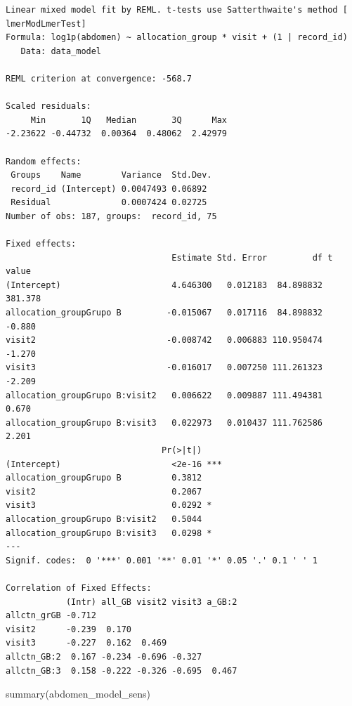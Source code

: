 \documentclass[
  letterpaper,
  DIV=11,
  numbers=noendperiod]{scrartcl}
\newenvironment{Shaded}{\begin{snugshade}}{\end{snugshade}}
\newcommand{\FunctionTok}[1]{\textcolor[rgb]{0.28,0.35,0.67}{#1}}
\newcommand{\NormalTok}[1]{\textcolor[rgb]{0.00,0.23,0.31}{#1}}
\begin{document}
\begin{verbatim}
Linear mixed model fit by REML. t-tests use Satterthwaite's method [
lmerModLmerTest]
Formula: log1p(abdomen) ~ allocation_group * visit + (1 | record_id)
   Data: data_model

REML criterion at convergence: -568.7

Scaled residuals: 
     Min       1Q   Median       3Q      Max 
-2.23622 -0.44732  0.00364  0.48062  2.42979 

Random effects:
 Groups    Name        Variance  Std.Dev.
 record_id (Intercept) 0.0047493 0.06892 
 Residual              0.0007424 0.02725 
Number of obs: 187, groups:  record_id, 75

Fixed effects:
                                 Estimate Std. Error         df t value
(Intercept)                      4.646300   0.012183  84.898832 381.378
allocation_groupGrupo B         -0.015067   0.017116  84.898832  -0.880
visit2                          -0.008742   0.006883 110.950474  -1.270
visit3                          -0.016017   0.007250 111.261323  -2.209
allocation_groupGrupo B:visit2   0.006622   0.009887 111.494381   0.670
allocation_groupGrupo B:visit3   0.022973   0.010437 111.762586   2.201
                               Pr(>|t|)    
(Intercept)                      <2e-16 ***
allocation_groupGrupo B          0.3812    
visit2                           0.2067    
visit3                           0.0292 *  
allocation_groupGrupo B:visit2   0.5044    
allocation_groupGrupo B:visit3   0.0298 *  
---
Signif. codes:  0 '***' 0.001 '**' 0.01 '*' 0.05 '.' 0.1 ' ' 1

Correlation of Fixed Effects:
            (Intr) all_GB visit2 visit3 a_GB:2
allctn_grGB -0.712                            
visit2      -0.239  0.170                     
visit3      -0.227  0.162  0.469              
allctn_GB:2  0.167 -0.234 -0.696 -0.327       
allctn_GB:3  0.158 -0.222 -0.326 -0.695  0.467
\end{verbatim}

\begin{Shaded}
\begin{Highlighting}[]
\FunctionTok{summary}\NormalTok{(abdomen\_model\_sens)}
\end{Highlighting}
\end{Shaded}
\end{document}
